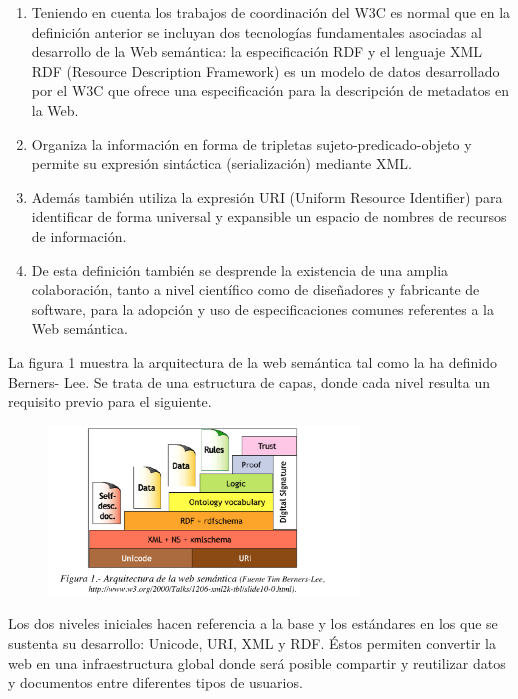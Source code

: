 \begin{enumerate}
	\item Teniendo en cuenta los trabajos de coordinación del W3C es normal que en la definición anterior se incluyan dos tecnologías fundamentales asociadas al desarrollo de la Web semántica: la especificación RDF y el lenguaje XML RDF (Resource Description Framework) es un modelo de datos desarrollado por el W3C que ofrece una especificación para la descripción de metadatos en la Web.
	
	\item Organiza la información en forma de tripletas sujeto-predicado-objeto y permite su expresión sintáctica (serialización) mediante XML.
	
	\item Además también utiliza la expresión URI (Uniform Resource Identifier) para identificar de forma universal y expansible un espacio de nombres de recursos de información.
	
	\item De esta definición también se desprende la existencia de una amplia colaboración, tanto a nivel científico como de diseñadores y fabricante de software, para la adopción y uso de especificaciones comunes referentes a la Web semántica.
\end{enumerate}

La figura 1 muestra la arquitectura de la web semántica tal como la ha definido Berners- Lee. Se trata de una estructura de capas, donde cada nivel resulta un requisito previo para el siguiente.

\begin{figure}[H]
	\centering
	\includegraphics[height=4.5cm]{imagenes/capitulo3/24} %
	\caption{}
	\label{}
\end{figure}

Los dos niveles iniciales hacen referencia a la base y los estándares en los que se sustenta su desarrollo: Unicode, URI, XML y RDF. Éstos permiten convertir la web en una infraestructura global donde será posible compartir y reutilizar datos y documentos entre diferentes tipos de usuarios.


